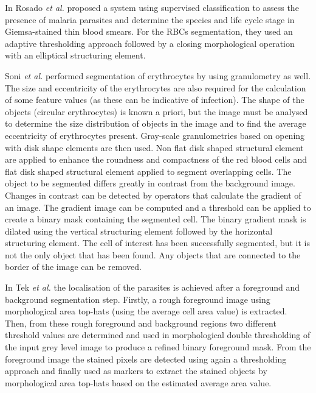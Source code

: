 \documentclass[sensors,review,submit,moreauthors,pdftex,10pt,a4paper]{mdpi}
\begin{document}
	In \cite{Rosado2017} Rosado \emph{et al.} proposed a system using supervised classification to assess the presence of malaria parasites and determine the species and life cycle stage in Giemsa-stained thin blood smears. For the RBCs segmentation, they used an adaptive thresholding approach followed by a closing morphological operation with an elliptical structuring element.
	
	Soni \emph{et al.} \cite{Soni2011} performed segmentation of erythrocytes by using granulometry as well. The size and eccentricity of the erythrocytes are also required for the calculation of some feature values (as these can be indicative of infection). The shape of the objects (circular erythrocytes) is known a priori, but the image must be analysed to determine the size distribution of objects in the image and to find the average eccentricity of erythrocytes present.
	Gray-scale granulometries based on opening with disk shape elements are then used. Non flat disk shaped structural element are applied to enhance the roundness and compactness of the red blood cells and flat disk shaped structural element applied to segment overlapping cells. The object to be segmented differs greatly in contrast from the background image. Changes in contrast can be detected by operators that calculate the gradient of an image. The gradient image can be computed and a threshold can be applied to create a binary mask containing the segmented cell. The binary gradient mask is dilated using the vertical structuring element followed by the horizontal structuring element. The cell of interest has been successfully segmented, but it is not the only object that has been found. Any objects that are connected to the border of the image can be removed.
	
	In \cite{Tek2010} Tek \emph{et al.} the localisation of the parasites is achieved after a foreground and background segmentation step. Firstly, a rough foreground image using morphological area top-hats (using the average cell area value) is extracted. Then, from these rough foreground and background regions two different threshold values are determined and used in morphological double thresholding of the input grey level image to produce a refined binary foreground mask. From the foreground image the stained pixels are detected using again a thresholding approach and finally used as markers to extract the stained objects by morphological area top-hats based on the estimated average area value.
	
\end{document}
